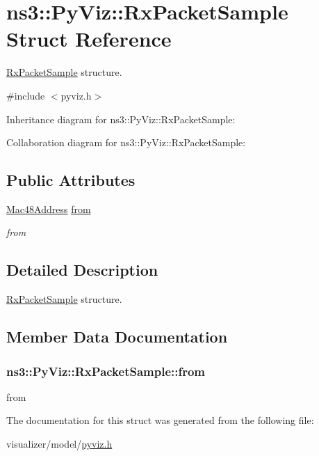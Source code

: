 \hypertarget{structns3_1_1PyViz_1_1RxPacketSample}{}\section{ns3\+:\+:Py\+Viz\+:\+:Rx\+Packet\+Sample Struct Reference}
\label{structns3_1_1PyViz_1_1RxPacketSample}


\hyperlink{structns3_1_1PyViz_1_1RxPacketSample}{Rx\+Packet\+Sample} structure.  




{\ttfamily \#include $<$pyviz.\+h$>$}



Inheritance diagram for ns3\+:\+:Py\+Viz\+:\+:Rx\+Packet\+Sample\+:


Collaboration diagram for ns3\+:\+:Py\+Viz\+:\+:Rx\+Packet\+Sample\+:
\subsection*{Public Attributes}
\begin{DoxyCompactItemize}
\item 
\hyperlink{classns3_1_1Mac48Address}{Mac48\+Address} \hyperlink{structns3_1_1PyViz_1_1RxPacketSample_a336affa26d3b359807faa62cc47a6285}{from}
\begin{DoxyCompactList}\small\item\em from \end{DoxyCompactList}\end{DoxyCompactItemize}


\subsection{Detailed Description}
\hyperlink{structns3_1_1PyViz_1_1RxPacketSample}{Rx\+Packet\+Sample} structure. 

\subsection{Member Data Documentation}
\subsubsection[{\texorpdfstring{from}{from}}]{ ns3\+::\+Py\+Viz\+::\+Rx\+Packet\+Sample\+::from}\hypertarget{structns3_1_1PyViz_1_1RxPacketSample_a336affa26d3b359807faa62cc47a6285}{}\label{structns3_1_1PyViz_1_1RxPacketSample_a336affa26d3b359807faa62cc47a6285}


from 



The documentation for this struct was generated from the following file\+:\begin{DoxyCompactItemize}
\item 
visualizer/model/\hyperlink{pyviz_8h}{pyviz.\+h}\end{DoxyCompactItemize}
